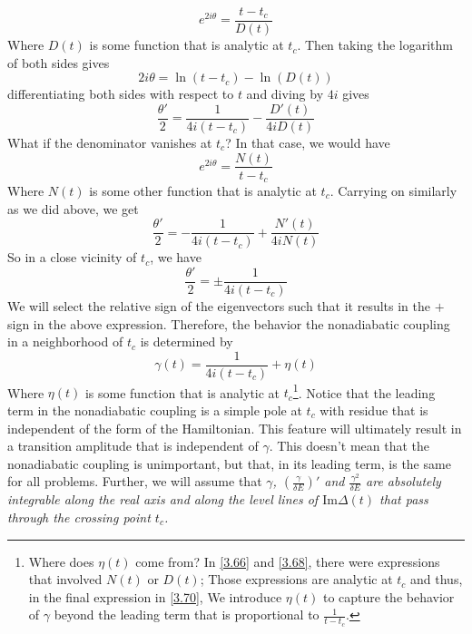 \documentclass[12pt,a4paper]{article}
\begin{document}
	\begin{equation}
		e^{2i\theta} = \dfrac{t - t_{c}}{D(t)}
	\end{equation}
	Where $D(t)$ is some function that is analytic at $t_{c}$. Then taking the logarithm of both sides gives
	\begin{equation}
		2i\theta = \ln(t-t_{c}) - \ln(D(t))
	\end{equation}
	differentiating both sides with respect to $t$ and diving by $4i$ gives
	\begin{equation}
		\frac{\theta'}{2} = \dfrac{1}{4i \left( t - t_{c} \right)} - \dfrac{D'(t)}{4iD(t)} \label{3.66}
	\end{equation}
	What if the denominator vanishes at $t_{c}$? In that case, we would have
	\begin{equation}
		e^{2i\theta} = \dfrac{N(t)}{t - t_{c}}
	\end{equation}
	Where $N(t)$ is some other function that is analytic at $t_{c}$. Carrying on similarly as we did above, we get
	\begin{equation}
			\frac{\theta'}{2} = -\dfrac{1}{4i \left( t - t_{c} \right)} + \dfrac{N'(t)}{4iN(t)} \label{3.68}
	\end{equation}
	So in a close vicinity of $t_{c}$, we have
	\begin{equation}
		\frac{\theta'}{2} = \pm \dfrac{1}{4i \left( t-t_{c} \right)}
	\end{equation}
	We will select the relative sign of the eigenvectors such that it results in the $+$ sign in the above expression. Therefore, the behavior the nonadiabatic coupling in a neighborhood of $t_{c}$ is determined by
	\begin{equation}
		\boxed{\gamma(t) = \dfrac{1}{4i \left( t-t_{c} \right)} + \eta(t)} \label{3.70}
	\end{equation}
	Where $\eta(t)$ is some function that is analytic at $t_{c}$\footnote{Where does $\eta(t)$ come from? In \eqref{3.66} and \eqref{3.68}, there were expressions that involved $N(t)$ or $D(t)$; Those expressions are analytic at $t_{c}$ and thus, in the final expression in \eqref{3.70}, We introduce $\eta(t)$ to capture the behavior of $\gamma$ beyond the leading term that is proportional to $\frac{1}{t-t_{c}}$.}. Notice that the leading term in the nonadiabatic coupling is a simple pole at $t_{c}$ with residue that is independent of the form of the Hamiltonian. This feature will ultimately result in a transition amplitude that is independent of $\gamma$. This doesn't mean that the nonadiabatic coupling is unimportant, but that, in its leading term, is the same for all problems. Further, we will assume that \emph{$\gamma$, $\left( \frac{\gamma}{\delta E} \right)'$ and $\frac{\gamma^{2}}{\delta E}$ are absolutely integrable along the real axis and along the level lines of $\mathrm{Im} \Delta (t)$ that pass through the crossing point $t_{c}$.} \\
	
\end{document}
